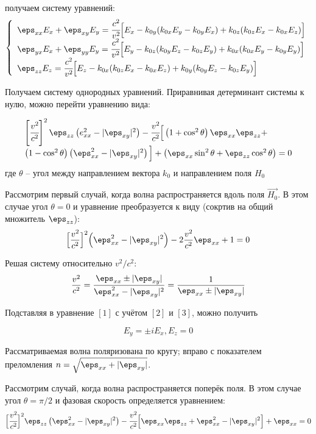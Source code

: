 получаем систему уравнений:
\[
	\left\{ \begin{array}{ll}
		\eps_{xx} E_x + \eps_{xy} E_y = \cfrac{c^2}{v^2}\Big[ 
			E_x - k_{0y}(k_{0x}E_y - k_{0y}E_x) + 
			k_{0z}(k_{0z}E_x - k_{0x}E_z) \Big] \\
		\eps_{yx} E_x + \eps_{yy} E_y = \cfrac{c^2}{v^2}\Big[
			E_y - k_{0z}(k_{0y}E_z - k_{0z}E_y) + 
			k_{0x}(k_{0x}E_y - k_{0y}E_y)\Big] \\
		\eps_{zz} E_z = \cfrac{c^2}{v^2}\Big[ E_z - 
			k_{0x}(k_{0z}E_x - k_{0x}E_z) + 
			k_{0y}(k_{0y}E_z - k_{0z}E_y ) 
			\Big]
	\end{array} \right.
\]

Получаем систему однородных уравнений. Приравнивая детерминант системы к нулю, 
можно перейти уравнению вида:

\[
	\begin{array}{ll}
	\left[\cfrac{v^2}{c^2}\right]^2 \eps_{zz}\left( e^2_{xx} - 
		\vert \eps_{xy} \vert^2 \right) - \cfrac{v^2}{c^2}
		\Big[ \left( 1 + \cos^2\theta \right) \eps_{xx}\eps_{zz} + \\
		\left( 1 - \cos^2\theta \right) \left( \eps^2_{xx} - 
		\vert\eps_{xy}\vert^2 \right)\Big] + \left( \eps_{xx}\sin^2\theta + 
		\eps_{zz}\cos^2\theta \right) = 0
	\end{array}
\]
где \( \theta \) -- угол между направлением вектора \( k_0 \) 
и направлением поля \( H_0 \)

Рассмотрим первый случай, когда волна распространяется вдоль поля 
\( \vec{H_0} \). В этом случае угол \( \theta = 0 \) и уравнение преобразуется 
к виду (сокртив на общий множитель \( \eps_{zz} \)):
\[
	\Big[ \frac{v^2}{c^2} \Big]^2 \Big( \eps^2_{xx} - 
		\vert\eps_{xy}\vert^2 \Big) - 2\frac{v^2}{c^2}\eps_{xx} + 1 = 0
\] 

Решая систему относительно \( v^2 / c^2 \):
\[
	\frac{v^2}{c^2} = \frac{\eps_{xx} \pm \vert \eps_{xy} \vert}
		{\eps^2_{xx} - \vert\eps_{xy}\vert^2} = 
		\frac{1}{\eps_{xx} \pm \vert\eps_{xy}\vert}
\]

Подставляя в уравнение \( [1] \) с учётом \( [2] \) и \( [3] \), можно 
получить 

\[ E_y = \pm i E_x, E_z = 0 \] 

Рассматриваемая волна поляризована по кругу; вправо с показателем преломления 
\( n = \sqrt{\eps_{xx} + \vert\eps_{xy}\vert} \). 

Рассмотрим случай, когда волна распространяется поперёк поля. В этом случае 
угол \( \theta = \pi / 2 \) и фазовая скорость определяется уравнением:
\[
	\Big[ \cfrac{v^2}{c^2} \Big]^2 \eps_{zz}\left( \eps^2_{xx} - 
		\vert\eps_{xy}\vert^2 \right) - \cfrac{v^2}{c^2}
		\Big[ \eps_{xx}\eps_{zz} + \eps^2_{xx} - 
		\vert\eps_{xy}\vert^2\Big] + \eps_{xx} = 0
\]


